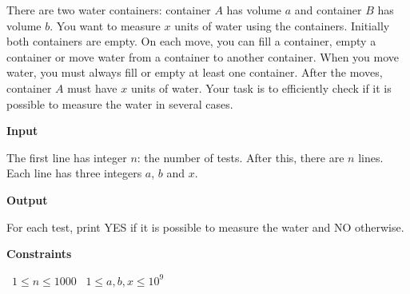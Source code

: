 There are two water containers: container $A$ has volume $a$ and container $B$ has volume $b$. You want to measure $x$ units of water using the containers.
Initially both containers are empty. On each move, you can fill a container, empty a container or move water from a container to another container. When you move water, you must always fill or empty at least one container. After the moves, container $A$ must have $x$ units of water.
Your task is to efficiently check if it is possible to measure the water in several cases.

\vspace{0.3cm}\noindent\textbf{Input}

The first line has integer $n$: the number of tests.
After this, there are $n$ lines. Each line has three integers $a$, $b$ and $x$.

\vspace{0.3cm}\noindent\textbf{Output}

For each test, print YES if it is possible to measure the water and NO otherwise.

\vspace{0.3cm}\noindent\textbf{Constraints}

\textbullet\ $1 \le n \le 1000$
\textbullet\ $1 \le a, b, x \le 10^9$
